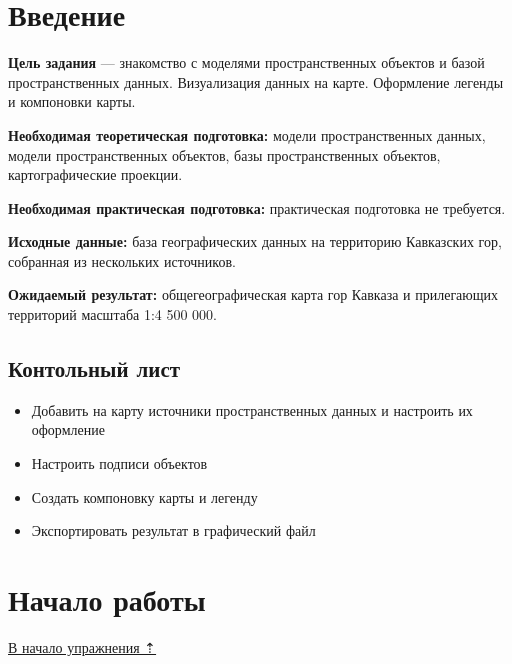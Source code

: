 \documentclass[
  12pt,
]{book}
\providecommand{\tightlist}{%
  \setlength{\itemsep}{0pt}\setlength{\parskip}{0pt}}
\begin{document}
\hypertarget{map-design-general-intro}{%
\section{Введение}\label{map-design-general-intro}}

\textbf{Цель задания} --- знакомство с моделями пространственных объектов и базой пространственных данных. Визуализация данных на карте. Оформление легенды и компоновки карты.

\textbf{Необходимая теоретическая подготовка:} модели пространственных данных, модели пространственных объектов, базы пространственных объектов, картографические проекции.

\textbf{Необходимая практическая подготовка:} практическая подготовка не требуется.

\textbf{Исходные данные:} база географических данных на территорию Кавказских гор, собранная из нескольких источников.

\textbf{Ожидаемый результат:} общегеографическая карта гор Кавказа и прилегающих территорий масштаба 1:4 500 000.

\hypertarget{map-design-general-checklist}{%
\subsection{Контольный лист}\label{map-design-general-checklist}}

\begin{itemize}
\tightlist
\item
  Добавить на карту источники пространственных данных и настроить их оформление
\item
  Настроить подписи объектов
\item
  Создать компоновку карты и легенду
\item
  Экспортировать результат в графический файл
\end{itemize}

\hypertarget{map-design-general-begin}{%
\section{Начало работы}\label{map-design-general-begin}}

\protect\hyperlink{map-design-general}{В начало упражнения ⇡}
\end{document}
